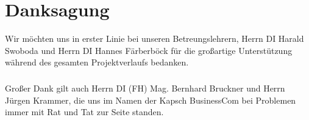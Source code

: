\chapter{Danksagung}
Wir möchten uns in erster Linie bei unseren Betreungslehrern, Herrn DI Harald Swoboda und Herrn DI Hannes Färberböck für die großartige Unterstützung während des gesamten Projektverlaufs bedanken.
\paragraph*{}
Großer Dank gilt auch Herrn DI (FH) Mag. Bernhard Bruckner und Herrn Jürgen Krammer, die uns im Namen der Kapsch BusinessCom bei Problemen immer mit Rat und Tat zur Seite standen.

